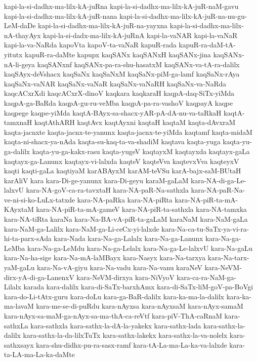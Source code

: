 {kapi-la-si-dadhx-ma-lilx-kA-juRna
kapi-la-si-dadhx-ma-lilx-kA-juR-naM-gavu
kapi-la-si-dadhx-ma-lilx-kA-juR-nana
kapi-la-si-dadhx-ma-lilx-kA-juR-na-nu-gu-LeM-daDe
kapi-la-si-dadhx-ma-lilx-kA-juR-na-yayxna
kapi-la-si-dadhx-ma-lilx-nA-thayAyx
kapi-la-si-dadx-ma-lilx-kA-juRnA
kapi-la-vaNAR
kapi-la-vaNaR
kapi-la-va-NaRda
kapoVta
kapoV-ta-vaNaR
kapuR-rada
kapuR-ra-daM-tA-yitutx
kapuR-ra-daMte
kapupx
kaqSANx
kaqSANxH
kaqSANx-jina
kaqSANx-nA-li-geya
kaqSANxnf
kaqSANx-pa-ra-shu-hasatxM
kaqSANx-va-tA-ra-dalilx
kaqSAyx-deVshacx
kaqSaNx
kaqSaNxM
kaqSaNx-piM-ga-lamf
kaqSaNx-rAya
kaqSaNx-vaNAR
kaqSaNx-vaNaR
kaqSaNx-vaNaRH
kaqSaNx-va-NaRda
kaqcACxrXdi
kaqcACxrX-dinoV
kaqkara
kaqkaraH
kaqpA-daq-SiTx-yiMda
kaqpA-ga-BaRda
kaqpA-gu-ru-veMba
kaqpA-pa-ra-vashoV
kaqpayA
kaqpe
kaqpege
kaqpe-yiMda
kaqtA-BAyx-sa-shacx-yAR-pA-dA-nu-va-taRkaH
kaqtA-tamxnaH
kaqtAthARH
kaqtAvx
kaqtAyxni
kaqtaH
kaqtaM
kaqta-dAvxraM
kaqta-jacnxte
kaqta-jacnx-te-yanunx
kaqta-jacnx-te-yiMda
kaqtamf
kaqta-midaM
kaqta-ni-shacx-ya-nAda
kaqta-su-kaq-ta-va-shadiM
kaqtava
kaqta-yuga
kaqta-yu-ga-dalilx
kaqta-yu-ga-kakx-rasu
kaqta-yugeV
kaqtayxM
kaqtayxda
kaqtayx-gaLa
kaqtayx-ga-Lanunx
kaqtayx-vi-lalxda
kaqteV
kaqteVva
kaqtevxVva
kaqteyxV
kaqti
kaqti-gaLa
kaqtiyaM
karABAyxM
karAM-teVSu
karA-bajx-saM-BUtaH
karAliV
kara
kara-Di-ge-yanunx
kara-Di-geyu
karaM-gaLaM
kara-NA-di-ga-Le-lalxvU
kara-NA-goV-ca-ra-tavxtaH
kara-NA-paR-Na-sathxla
kara-NA-paR-Na-ve-ni-si-ko-LuLx-tatxde
kara-NA-paRka
kara-NA-piRta
kara-NA-piR-ta-mA-KAyxtaM
kara-NA-piR-ta-mA-gameV
kara-NA-piR-ta-sathxla
kara-NA-tamxka
kara-NA-tiRta
karaNa
kara-Na-BA-vA-piR-ta-gaLaM
karaNaM
kara-NaM-gaLa
kara-NaM-ga-Lalilx
kara-NaM-ga-Li-ceCx-yi-lalxde
kara-Na-ca-tu-SaTx-ya-vi-ra-hi-ta-parx-sAda
kara-Nada
kara-Na-ga-Lalalx
kara-Na-ga-Lanunx
kara-Na-ga-LeMba
kara-Na-ga-LeMdu
kara-Na-ga-Lelalx
kara-Na-ga-Le-lalxvU
kara-Na-gaLu
kara-Na-ha-sige
kara-Na-mA-laMBayx
kara-Nasyx
kara-Na-tarxya
kara-Na-tarx-yaM-gaLu
kara-Na-vA-giyu
kara-Na-vadu
kara-Na-vanu
karaNeV
kara-NeVM-dirx-yA-di-ga-LanenxV
kara-NeVM-dirxya
kara-NiVyoV
kara-ca-ra-NaM-ga-Lilalx
karada
kara-dalilx
kara-di-SaTx-barxhAmx
kara-di-SaTx-liM-goV-pa-BoVgi
kara-do-Li-tAtx-guru
kara-doLu
kara-ga-BaR-dalilx
kara-ka-ma-la-dalilx
kara-ka-ma-lavaM
kara-me-se-di-puRdu
kara-nAyxsa
kara-nAyxsaM
kara-nAyx-samaM
kara-nAyx-sa-maM-ga-nAyx-sa-ma-thA-ca-reVtf
kara-piV-ThA-caRnaM
kara-sathxLa
kara-sathxla
kara-sathx-la-dA-la-yakekx
kara-sathx-lada
kara-sathx-la-dalilx
kara-sathx-la-da-lilxTuTx
kara-sathx-lakekx
kara-sathx-la-va-nolelx
kara-sathxsayx
kara-shu-didhx-pu-ra-sasx-ramf
kara-tA-La-ma-La-ka-va-lalxde
kara-ta-LA-ma-La-ka-daMte
}
